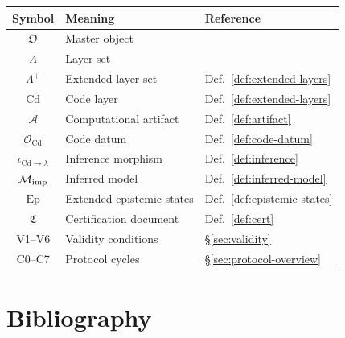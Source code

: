 \documentclass[11pt,a4paper]{article}
\theoremstyle{definition}
\theoremstyle{plain}
\newcommand{\Lam}{\Lambda}
\newcommand{\Cd}{\mathrm{Cd}}
\newcommand{\Ob}{\mathfrak{O}}
\newcommand{\Mcal}{\mathcal{M}}
\newcommand{\Acal}{\mathcal{A}}
\newcommand{\Ocal}{\mathcal{O}}
\begin{document}
\begin{center}
\begin{tabular}{c l l}
  \toprule
  Symbol & Meaning & Reference \\
  \midrule
  $\Ob$ & Master object & \cite[Def.~1.1]{framework} \\
  $\Lam$ & Layer set & \cite[Def.~1.2]{framework} \\
  $\Lam^+$ & Extended layer set & Def.~\ref{def:extended-layers} \\
  $\Cd$ & Code layer & Def.~\ref{def:extended-layers} \\
  $\Acal$ & Computational artifact & Def.~\ref{def:artifact} \\
  $\Ocal_\Cd$ & Code datum & Def.~\ref{def:code-datum} \\
  $\iota_{\Cd \to \lambda}$ & Inference morphism & Def.~\ref{def:inference} \\
  $\Mcal_{\rm imp}$ & Inferred model & Def.~\ref{def:inferred-model} \\
  $\mathrm{Ep}$ & Extended epistemic states & Def.~\ref{def:epistemic-states} \\
  $\mathfrak{C}$ & Certification document & Def.~\ref{def:cert} \\
  V1--V6 & Validity conditions & \S\ref{sec:validity} \\
  C0--C7 & Protocol cycles & \S\ref{sec:protocol-overview} \\
  \bottomrule
\end{tabular}
\end{center}

\section{Bibliography}
\label{app:biblio}
\end{document}
